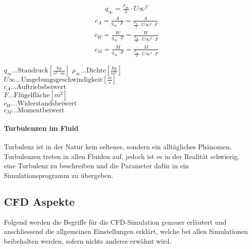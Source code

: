 \begin{align}
q_\infty = \frac{\rho_\infty}{2}\cdot U\infty^2
\label{eq:staudruck}
\end{align}
\begin{align}
c_A = \frac{A}{q_\infty\cdot F} = \frac{A}{\frac{\rho_\infty}{2}\cdot U\infty^2\cdot F}
\label{eq:auftreibsbeiwert}
\end{align}
\begin{align}
c_W = \frac{W}{q_\infty\cdot F} = \frac{W}{\frac{\rho_\infty}{2}\cdot U\infty^2\cdot F}
\label{eq:widersteandsbeiwert}
\end{align}
\begin{align}
c_M = \frac{M}{q_\infty\cdot F} = \frac{M}{\frac{\rho_\infty}{2}\cdot U\infty^2\cdot F}
\label{eq:momentenbeiwert}
\end{align}

\begin{center}
\begin{minipage}{0.5\linewidth}
$q_\infty \dots \text{Staudruck} \left[\frac{kg}{s^2\cdot m}\right]$
$\rho_\infty \dots \text{Dichte} \left[\frac{kg}{m^3}\right]$ \\
$U\infty \dots \text{Umgebungsgeschwindigkeit} \left[\frac{m}{s}\right]$ \\
$c_A \dots \text{Auftriebsbeiwert} $\\
$F \dots \text{Flügelfläche} \left[m^2\right]$ \\
$c_W \dots \text{Widerstandsbeiwert} $\\
$c_M \dots \text{Momentbeiwert} $\\
\end{minipage}
\end{center}


\paragraph{Turbulenzen im Fluid} 
\label{para:turbulenzen_im_fluid}
$\;$\\
Turbulenz ist  in der Natur kein seltenes, sondern ein alltägliches Phänomen. Turbulenzen treten in allen Fluiden auf, jedoch ist es in der Realität schwierig, eine Turbulenz zu beschreiben und die Parameter dafür in ein Simulationsprogramm zu übergeben.


\subsection{CFD Aspekte}
\label{subsec:cfd_aspekte}
Folgend werden die Begriffe für die CFD-Simulation genauer erläutert und anschliessend die allgemeinen Einstellungen erklärt, welche bei allen Simulationen beibehalten werden, sofern nichts anderes erwähnt wird.


